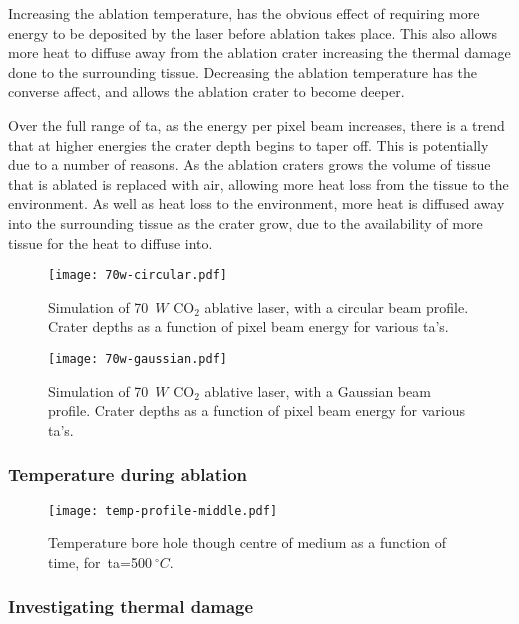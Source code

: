 Increasing the ablation temperature, has the obvious effect of requiring more energy to be deposited by the laser before ablation takes place. This also allows more heat to diffuse away from the ablation crater increasing the thermal damage done to the surrounding tissue. Decreasing the ablation temperature has the converse affect, and allows the ablation crater to become deeper.

Over the full range of \gls*{ta}, as the energy per pixel beam increases, there is a trend that at higher energies the crater depth begins to taper off. This is potentially due to a number of reasons. As the ablation craters grows the volume of tissue that is ablated is replaced with air, allowing more heat loss from the tissue to the environment. As well as heat loss to the environment, more heat is diffused away into the surrounding tissue as the crater grow, due to the availability of more tissue for the heat to diffuse into.


\begin{figure}
	\centering
    \texttt{[image: 70w-circular.pdf]}
    \caption{Simulation of 70~$W$ CO$_2$ ablative laser, with a circular beam profile. Crater depths as a function of pixel beam energy for various \gls*{ta}'s.}
    \label{fig:tacirc}
\end{figure}
 
 \begin{figure}
	\centering
    \texttt{[image: 70w-gaussian.pdf]}
    \caption{Simulation of 70~$W$ CO$_2$ ablative laser, with a Gaussian beam profile. Crater depths as a function of pixel beam energy for various \gls*{ta}'s.}
    \label{fig:tagauss}
\end{figure}

\subsubsection*{Temperature during ablation}

\begin{figure}[!ht]
	\centering
	\texttt{[image: temp-profile-middle.pdf]}
	\caption{Temperature bore hole though centre of medium as a function of time, for~\gls*{ta}=500$~^{\circ}C$.}
	\label{fig:temp-500profile}
\end{figure}


\subsubsection*{Investigating thermal damage} 


